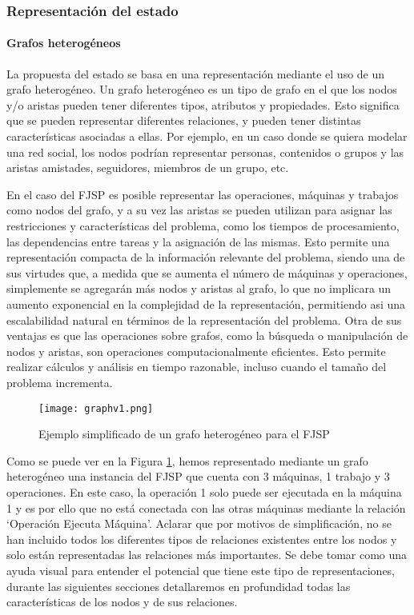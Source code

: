 \subsubsection{Representación del estado}
\paragraph{Grafos heterogéneos}
La propuesta del estado se basa en una representación mediante el uso de un grafo heterogéneo. Un grafo 
heterogéneo es un tipo de grafo en el que los nodos y/o aristas pueden tener diferentes tipos, atributos 
y propiedades. Esto significa que se pueden representar diferentes relaciones, y pueden tener distintas 
características asociadas a ellas. Por ejemplo, en un caso donde se quiera modelar una red social, 
los nodos podrían representar personas, contenidos o grupos y las aristas amistades, seguidores, 
miembros de un grupo, etc.\medskip 

En el caso del FJSP es posible representar las operaciones, máquinas y trabajos como nodos del grafo, 
y a su vez las aristas se pueden utilizan para asignar las restricciones y características del problema, como los tiempos de 
procesamiento, las dependencias entre tareas y la asignación de las mismas. Esto permite una representación 
compacta de la información relevante del problema, siendo una de sus virtudes que, a medida que se aumenta 
el número de máquinas y operaciones, simplemente se agregarán más nodos y aristas al grafo, lo que no 
implicara un aumento exponencial en la complejidad de la representación, permitiendo asi una escalabilidad 
natural en términos de la representación del problema. Otra de sus ventajas es que las operaciones sobre 
grafos, como la búsqueda o manipulación de nodos y aristas, son operaciones computacionalmente eficientes. 
Esto permite realizar cálculos y análisis en tiempo razonable, incluso cuando el tamaño del problema incrementa. 

\begin{figure}[ht]
    \centering
    \texttt{[image: graphv1.png]}
    \caption{Ejemplo simplificado de un grafo heterogéneo para el FJSP}
    \label{fig:grafo-heterogeneo}
\end{figure}

Como se puede ver en la Figura \ref{fig:grafo-heterogeneo}, hemos representado mediante un grafo
heterogéneo una instancia del FJSP que cuenta con 3 máquinas, 1 trabajo y 3 operaciones. En este caso, 
la operación 1 solo puede ser ejecutada en la máquina 1 y es por ello que no está conectada con 
las otras máquinas mediante la relación `Operación Ejecuta Máquina'. Aclarar que por motivos de 
simplificación, no se han incluido todos los diferentes tipos de relaciones existentes entre 
los nodos y solo están representadas las relaciones más importantes. Se debe tomar como una ayuda 
visual para entender el potencial que tiene este tipo de representaciones, durante las siguientes 
secciones detallaremos en profundidad todas las características de los nodos y de sus relaciones.

